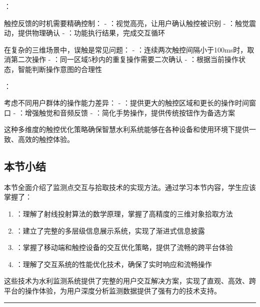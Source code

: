 ：


触控反馈的时机需要精确控制： - ：视觉高亮，让用户确认触控被识别 - ：触觉震动，提供物理确认 - ：功能执行结果，完成交互循环


在复杂的三维场景中，误触是常见问题： - ：连续两次触控间隔小于100ms时，取消第二次操作 - ：同一区域5秒内的重复操作需要二次确认 - ：根据当前操作状态，智能判断操作意图的合理性

：


考虑不同用户群体的操作能力差异： - ：提供更大的触控区域和更长的操作时间窗口 - ：增强触觉和音频反馈 - ：简化手势操作，提供传统按钮作为备选方案

这种多维度的触控优化策略确保智慧水利系统能够在各种设备和使用环境下提供一致、高效的触控体验。

\hypertarget{ux672cux8282ux5c0fux7ed3-2}{%
\subsection{本节小结}\label{ux672cux8282ux5c0fux7ed3-2}}

本节全面介绍了监测点交互与拾取技术的实现方法。通过学习本节内容，学生应该掌握了：

\begin{enumerate}
\def\labelenumi{\arabic{enumi}.}
\tightlist
\item
  ：理解了射线投射算法的数学原理，掌握了高精度的三维对象拾取方法
\item
  ：建立了完整的多层级信息展示系统，实现了渐进式信息披露
\item
  ：掌握了移动端和触控设备的交互优化策略，提供了流畅的跨平台体验
\item
  ：理解了交互系统的性能优化技术，确保了实时响应和流畅操作
\end{enumerate}

这些技术为水利监测系统提供了完整的用户交互解决方案，实现了直观、高效、跨平台的操作体验，为用户深度分析监测数据提供了强有力的技术支持。

\begin{center}\rule{0.5\linewidth}{0.5pt}\end{center}

